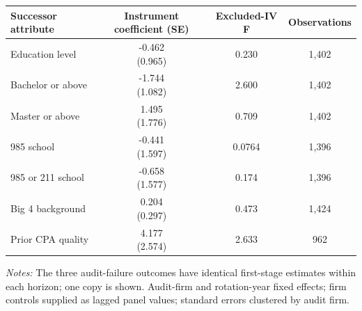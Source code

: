 \documentclass[10pt]{article}
\begin{document}
\begin{minipage}{19cm}\fontsize{10}{12}\selectfont\setlength{\tabcolsep}{4pt}\renewcommand{\arraystretch}{1.12}


\centering
{}
\begin{threeparttable}
\begin{tabular}{p{}ccc}
\toprule
Successor attribute & Instrument coefficient (SE) & Excluded-IV F & Observations \\
\midrule
Education level & \shortstack{-0.462\\(0.965)} & 0.230 & 1,402 \\
Bachelor or above & \shortstack{-1.744\\(1.082)} & 2.600 & 1,402 \\
Master or above & \shortstack{1.495\\(1.776)} & 0.709 & 1,402 \\
985 school & \shortstack{-0.441\\(1.597)} & 0.0764 & 1,396 \\
985 or 211 school & \shortstack{-0.658\\(1.577)} & 0.174 & 1,396 \\
Big 4 background & \shortstack{0.204\\(0.297)} & 0.473 & 1,424 \\
Prior CPA quality & \shortstack{4.177\\(2.574)} & 2.633 & 962 \\
\bottomrule
\end{tabular}
\begin{tablenotes}\fontsize{9}{11}\selectfont
\item \raggedright \fontsize{9}{11}\selectfont \textit{Notes:} The three audit-failure outcomes have identical first-stage estimates within each horizon; one copy is shown. Audit-firm and rotation-year fixed effects; firm controls supplied as lagged panel values; standard errors clustered by audit firm.
\end{tablenotes}
\end{threeparttable}

\end{minipage}
\end{document}
